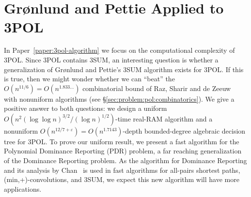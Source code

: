 \section{\done Gr\o nlund and Pettie Applied to 3POL}


%

%

In Paper~\ref{paper:3pol-algorithm}
we focus on the computational complexity of 3POL\@. Since 3POL contains 3SUM,
an interesting question is whether a generalization of Gr\o nlund and Pettie's
3SUM algorithm exists for 3POL\@. If this is true, then we might wonder whether
we can ``beat'' the $O(n^{11/6}) = O(n^{1.833\ldots})$ combinatorial bound of Raz,
Sharir and de Zeeuw~\cite{RSZ15} with nonuniform algorithms
(see \S\ref{sec:problem:pol:combinatorics}).
%
We give a positive
answer to both questions: we design
a uniform
$O(n^2 {(\log \log n)}^{3/2} / {(\log n)}^{1/2})$-time
real-RAM algorithm
and
a nonuniform
$O(n^{12/7+\varepsilon}) = O(n^{1.7143})$-depth
bounded-degree algebraic decision tree
for 3POL\@.
%
To prove our uniform result, we present a fast algorithm for the Polynomial
Dominance Reporting (PDR) problem, a far reaching generalization of the
Dominance Reporting problem. As the algorithm for Dominance Reporting and its
analysis by Chan~\cite{Cha08} is used in fast algorithms for all-pairs shortest
paths, (min,+)-convolutions, and 3SUM, we expect this new algorithm will have
more applications.

